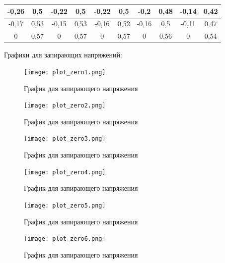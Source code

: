 \documentclass[a4paper, 12pt]{article}
\begin{document}
\begin{table}[H]
\begin{tabular}{|cc|cc|cc|cc|cc|}
	\multicolumn{1}{|c|}{-0,26}         & 0,5        & \multicolumn{1}{c|}{-0,22}         & 0,5        & \multicolumn{1}{c|}{-0,22}         & 0,5        & \multicolumn{1}{c|}{-0,2}          & 0,48       & \multicolumn{1}{c|}{-0,14}         & 0,42       \\ \hline
	\multicolumn{1}{|c|}{-0,17}         & 0,53       & \multicolumn{1}{c|}{-0,15}         & 0,53       & \multicolumn{1}{c|}{-0,16}         & 0,52       & \multicolumn{1}{c|}{-0,16}         & 0,5        & \multicolumn{1}{c|}{-0,11}         & 0,47       \\ \hline
	\multicolumn{1}{|c|}{0}             & 0,57       & \multicolumn{1}{c|}{0}             & 0,57       & \multicolumn{1}{c|}{0}             & 0,57       & \multicolumn{1}{c|}{0}             & 0,56       & \multicolumn{1}{c|}{0}             & 0,54       \\ \hline
	\end{tabular}
\end{table}

Графики для запирающих напряжений:

\begin{figure}[H]
    \centering
    \texttt{[image: plot\_zero1.png]}
    \caption{График для запирающего напряжения}
\end{figure}

\begin{figure}[H]
    \centering
    \texttt{[image: plot\_zero2.png]}
    \caption{График для запирающего напряжения}
\end{figure}

\begin{figure}[H]
    \centering
    \texttt{[image: plot\_zero3.png]}
    \caption{График для запирающего напряжения}
\end{figure}

\begin{figure}[H]
    \centering
    \texttt{[image: plot\_zero4.png]}
    \caption{График для запирающего напряжения}
\end{figure}

\begin{figure}[H]
    \centering
    \texttt{[image: plot\_zero5.png]}
    \caption{График для запирающего напряжения}
\end{figure}

\begin{figure}[H]
    \centering
    \texttt{[image: plot\_zero6.png]}
    \caption{График для запирающего напряжения}
\end{figure}
\end{document}
